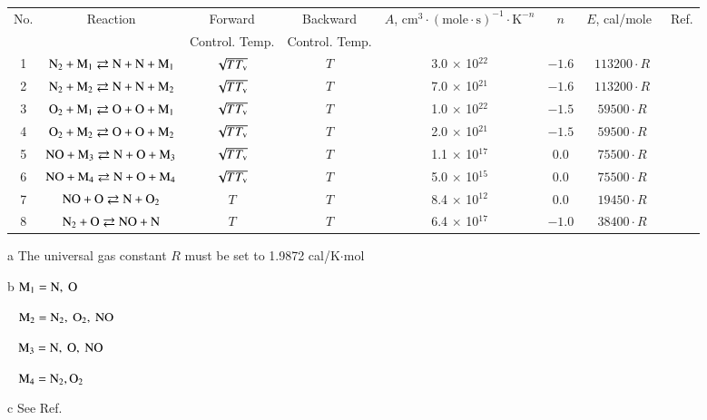 \documentclass{warpdoc}
\renewcommand{\fontsizetable}{\footnotesize\scalefont{0.9}}
\begin{document}
%
\begin{table}[t]
\fontsizetable
\begin{center}
\begin{threeparttable}
\begin{tabular}{cccccccc} 
\toprule
No. & Reaction\tnote{(b)} & Forward          & Backward    & $A$, $\textrm{cm}^3\cdot(\textrm{mole}\cdot \textrm{s})^{-1}\cdot \textrm{K}^{-n}$ & $n$ & $E$, cal/mole~\tnote{(a)} & Ref.\\ 
~   & ~                   & Control. Temp.   & Control. Temp.\tnote{(c)} &~ & ~ & ~ & ~\\
\midrule
1 & $\rm N_2 + M_1 \rightleftarrows N + N + M_1$ & $\sqrt{T T_{\rm v}}$ & $T$ & 3.0 $\times$ 10$^{22}$  & $-1.6$ & $113200 \cdot R$ & \cite{book:1990:park}\\
2 & $\rm N_2 + M_2 \rightleftarrows N + N + M_2$ & $\sqrt{T T_{\rm v}}$ & $T$ & 7.0 $\times$ 10$^{21}$  & $-1.6$ & $113200 \cdot R$ & \cite{book:1990:park}\\
3 & $\rm O_2 + M_1 \rightleftarrows O + O + M_1$ & $\sqrt{T T_{\rm v}}$ & $T$ & 1.0 $\times$ 10$^{22}$  & $-1.5$ & $59500 \cdot R$ & \cite{book:1990:park}\\
4 & $\rm O_2 + M_2 \rightleftarrows O + O + M_2$ & $\sqrt{T T_{\rm v}}$ & $T$ & 2.0 $\times$ 10$^{21}$  & $-1.5$ & $59500 \cdot R$ & \cite{book:1990:park}\\
5 & $\rm NO + M_3 \rightleftarrows N + O + M_3$ & $\sqrt{T T_{\rm v}}$ & $T$ & 1.1 $\times$ 10$^{17}$  & 0.0 & $75500 \cdot R$ & \cite{book:1990:park}\\
6 & $\rm NO + M_4 \rightleftarrows N + O + M_4$ & $\sqrt{T T_{\rm v}}$ & $T$ & 5.0 $\times$ 10$^{15}$  & 0.0 & $75500 \cdot R$ & \cite{book:1990:park}\\
7 & $\rm NO + O \rightleftarrows N + O_2 $ & $T$ & $T$ & 8.4 $\times$ 10$^{12}$  & 0.0 & $19450 \cdot R$ & \cite{book:1990:park}\\
8 & $\rm N_2 + O \rightleftarrows NO + N $ & $T$ & $T$ & 6.4 $\times$ 10$^{17}$  & $-1.0$ & $38400 \cdot R$ & \cite{book:1990:park}\\
\bottomrule
\end{tabular}
\begin{tablenotes}
\item[{a}] The universal gas constant $R$ must be set to 1.9872	cal/K$\cdot$mol 
\item[{b}] $\rm M_1=N,~O$
\item[~] $\rm M_2=N_2,~O_2,~NO$
\item[~] $\rm M_3= N,~O,~NO$
\item[~] $\rm M_4=N_2,O_2$
\item[{c}] See Ref.\ \cite{jtht:1991:candler}
\end{tablenotes}
\label{tab:park}
\end{threeparttable}
\end{center}
\end{table}
%
\end{document}
